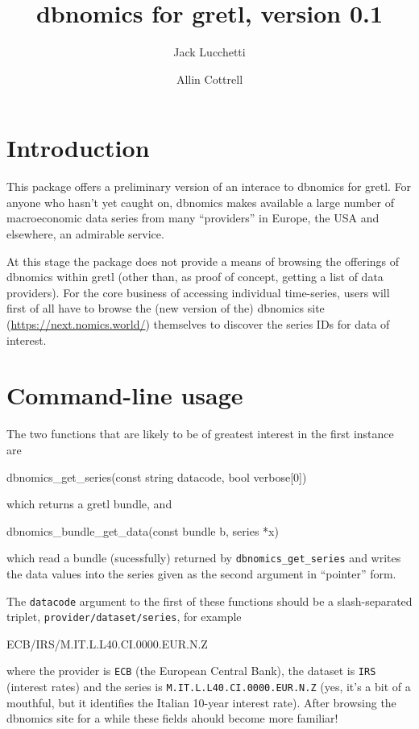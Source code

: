 \documentclass{article}
\begin{document}
\setlength{\parindent}{0pt}
\setlength{\parskip}{1ex}

\newcommand{\argname}[1]{\textsl{#1}}

\title{dbnomics for gretl, version 0.1}
\author{Jack Lucchetti \and Allin Cottrell}
\maketitle

\section{Introduction}

This package offers a preliminary version of an interace to
\textsf{dbnomics} for gretl. For anyone who hasn't yet caught on,
\textsf{dbnomics} makes available a large number of macroeconomic data
series from many ``providers'' in Europe, the USA and elsewhere, an
admirable service.

At this stage the package does not provide a means of browsing the
offerings of \textsf{dbnomics} within gretl (other than, as proof of
concept, getting a list of data providers). For the core business of
accessing individual time-series, users will first of all have to
browse the (new version of the) \textsf{dbnomics} site
(\url{https://next.nomics.world/}) themselves to discover the series
IDs for data of interest.

\section{Command-line usage}

The two functions that are likely to be of greatest interest in the
first instance are
\begin{code}
dbnomics_get_series(const string datacode, bool verbose[0])
\end{code}
which returns a gretl bundle, and
\begin{code}
dbnomics_bundle_get_data(const bundle b, series *x)
\end{code}
which read a bundle (sucessfully) returned by
\verb|dbnomics_get_series| and writes the data values into the series
given as the second argument in ``pointer'' form.

The \texttt{datacode} argument to the first of these functions should
be a slash-separated triplet, \texttt{provider/dataset/series}, for
example
\begin{code}
ECB/IRS/M.IT.L.L40.CI.0000.EUR.N.Z
\end{code}
where the provider is \texttt{ECB} (the European Central Bank), the
dataset is \texttt{IRS} (interest rates) and the series is
\texttt{M.IT.L.L40.CI.0000.EUR.N.Z} (yes, it's a bit of a mouthful,
but it identifies the Italian 10-year interest rate). After browsing
the \textsf{dbnomics} site for a while these fields ahould become more
familiar!
\end{document}
